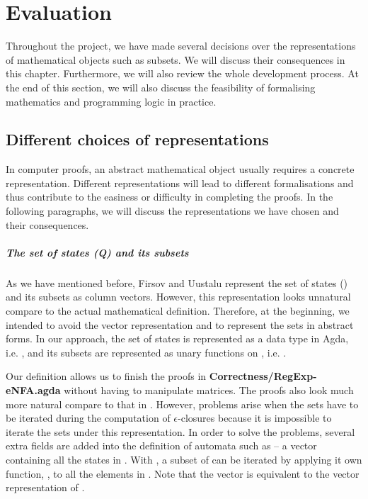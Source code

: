 \chapter{Evaluation}
\par Throughout the project, we have made several
decisions over the representations of mathematical objects such as
subsets. We will discuss their consequences in this
chapter. Furthermore, we will also review the whole development process. At the end of this section, we
will also discuss the feasibility of formalising mathematics and
programming logic in practice. 


\section{Different choices of representations}
\par In computer proofs, an abstract mathematical
object usually requires a concrete representation. Different representations will lead to different
formalisations and thus contribute to the
easiness or difficulty in completing the proofs. In the
following paragraphs, we will discuss the representations we have
chosen and their consequences. 

\paragraph{The set of states (Q) and its subsets} As we have mentioned
before, Firsov and Uustalu \cite{firsov2013} represent the set of states () and its subsets
as column vectors. However, this representation looks unnatural compare
to the actual mathematical definition. Therefore, at the beginning, we intended to avoid the vector representation and to
represent the sets in abstract forms. In our approach, the set of states is represented as a data type in Agda, i.e. , and its
subsets are represented as unary functions on , i.e. . 

\par Our definition allows us to finish the proofs in
\textbf{Correctness/RegExp-eNFA.agda} without having to
manipulate matrices. The proofs also look much more natural compare to that in
\cite{firsov2013}. However, problems arise when the sets have to be
iterated during the computation of \(\epsilon\)-closures because it is impossible to iterate the sets
under this representation. In order to solve the problems, several
extra fields are added into the definition of automata such as 
-- a vector containing all the states in . With , a subset
of  can be iterated by applying it own function, , to all the elements in . Note that the vector 
is equivalent to the vector representation of . 

